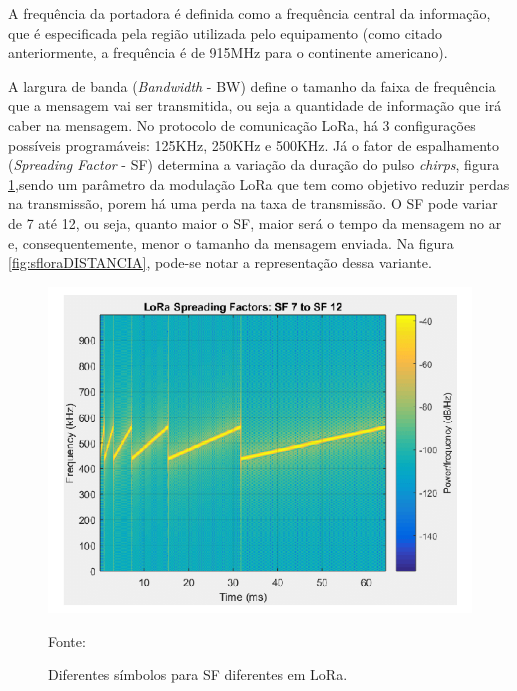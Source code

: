 \par A frequência da portadora é definida como a frequência central da informação, que é especificada pela região utilizada pelo equipamento (como citado anteriormente, a frequência é de 915MHz para o continente americano).

\par A largura de banda (\textit{Bandwidth} - BW) define o tamanho da faixa de frequência que a mensagem vai ser transmitida, ou seja a quantidade de informação que irá caber na mensagem. No protocolo de comunicação LoRa, há 3 configurações possíveis programáveis:  125KHz, 250KHz e 500KHz. Já o fator de espalhamento (\textit{Spreading Factor} - SF) determina a variação da duração do pulso \textit{chirps}, figura \ref{fig:sflora},sendo um parâmetro da modulação LoRa que tem como objetivo reduzir perdas na transmissão, porem há uma perda na taxa de transmissão. O SF pode variar de 7 até 12, ou seja, quanto maior o SF, maior será o tempo da mensagem no ar e, consequentemente, menor o tamanho da mensagem enviada. Na figura \ref{fig:sfloraDISTANCIA}, pode-se notar a representação dessa variante.

\begin{figure}[H]
  \centering
  \includegraphics[scale=0.75]{figuras/sflora.png}
  \caption{Diferentes símbolos para SF diferentes em LoRa. }
 { \footnotesize Fonte:\cite{lorasf1}} 
  \label{fig:sflora}
\end{figure}


